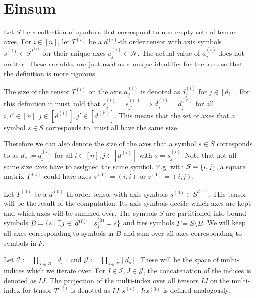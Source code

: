 \section{Einsum}

Let $S$ be a collection of symbols that correspond to non-empty sets of tensor axes.
For $i \in [n]$, let $T^{(i)}$ be a $d^{(i)}$-th order tensor with axis symbols $s^{(i)} \in S^{d^{(i)}}$ for their unique axes $a^{(i)}_j \in \mathcal{N}$.
The actual value of $a^{(i)}_j$ does not matter. These variables are just used as a unique identifier for the axes so that the definition is more rigorous.

The size of the tensor $T^{(i)}$ on the axis $a^{(i)}_j$ is denoted as $d^{(i)}_j$ for $j \in [d_i]$.
For this definition it must hold that $s^{(i)}_j = s^{(i')}_{j'} \implies d^{(i)}_j = d^{(i')}_{j'}$ for all $i,i' \in [n], j \in [d^{(i)}], j' \in [d^{(i')}]$.
This means that the set of axes that a symbol $s \in S$ corresponds to, must all have the same size.

Therefore we can also denote the size of the axes that a symbol $s \in S$ corresponds to as $d_s := d^{(i)}_j$ for all $i \in [n], j \in [d^{(i)}]$ with $s = s^{(i)}_j$.
Note that not all same size axes have to assigned the same symbol. E.g. with $S = \left\lbrace i,j \right\rbrace$, a square matrix $T^{(1)}$ could have axes $s^{(1)} = (i, i)$ or $s^{(1)} = (i, j)$.

Let $T^{(0)}$ be a $d^{(0)}$-th order tensor with axis symbols $s^{(0)} \in S^{d^{(0)}}$.
This tensor will be the result of the computation.
Its axis symbols decide which axes are kept and which axes will be summed over.
The symbols $S$ are partitioned into bound symbols $B = \lbrace s \mid \exists j \in [d^{(0)}]: s^{(0)}_j = s \rbrace$ and  free symbols $F = S \setminus B$.
We will keep all axes corresponding to symbols in $B$ and sum over all axes corresponding to symbols in $F$.

Let $\mathcal{I} := \prod_{s \in B} [d_s]$ and $\mathcal{J} := \prod_{s \in F} [d_s]$.
These will be the space of multi-indices which we iterate over.
For $I \in \mathcal{I}, J \in \mathcal{J}$, the concatenation of the indices is denoted as $IJ$.
The projection of the multi-index over all tensors $IJ$ on the multi-index for tensor $T^{(i)}$ is denoted as $IJ:s^{(i)}$.
$I:s^{(0)}$ is defined analogously.

